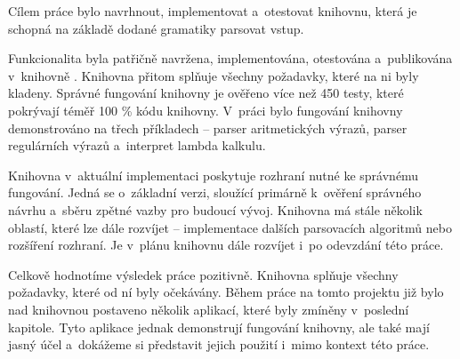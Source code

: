 \begin{conclusion}
	Cílem práce bylo navrhnout, implementovat a~otestovat knihovnu, která je schopná na základě dodané gramatiky parsovat vstup.
	
	Funkcionalita byla patřičně navržena, implementována, otestována a~publikována v~knihovně  \cite{GrammpyProject}. Knihovna přitom splňuje všechny požadavky, které na ni byly kladeny. Správné fungování knihovny je ověřeno více než 450 testy, které pokrývají téměř 100 \% kódu knihovny.
	V~práci bylo fungování knihovny demonstrováno na třech příkladech -- parser aritmetických výrazů, parser regulárních výrazů a~interpret lambda kalkulu.
	
	Knihovna v~aktuální implementaci poskytuje rozhraní nutné ke správnému fungování. Jedná se o~základní verzi, sloužící primárně k~ověření správného návrhu a~sběru zpětné vazby pro budoucí vývoj. Knihovna má stále několik oblastí, které lze dále rozvíjet -- implementace dalších parsovacích algoritmů nebo rozšíření rozhraní. Je v~plánu knihovnu dále rozvíjet i~po odevzdání této práce.
	
	Celkově hodnotíme výsledek práce pozitivně. Knihovna splňuje všech\-ny požadavky, které od ní byly očekávány. Během práce na tomto projektu již bylo nad knihovnou postaveno několik aplikací, které byly zmíněny v~poslední kapitole.
	Tyto aplikace jednak demonstrují fungování knihovny, ale také mají jasný účel a~dokážeme si představit jejich použití i~mimo kontext této práce.
\end{conclusion}